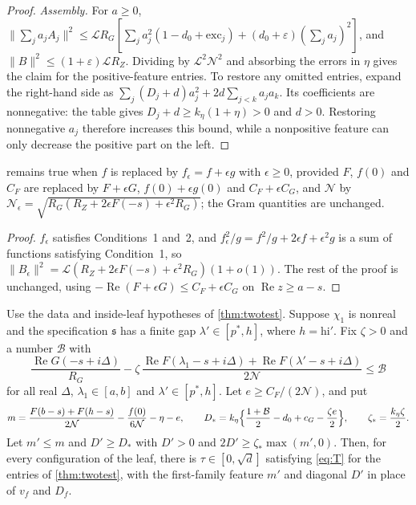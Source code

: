 \documentclass[11pt]{amsart}
\numberwithin{equation}{section}
\theoremstyle{plain}
\theoremstyle{definition}
\theoremstyle{remark}
\newcommand{\LL}{\mathcal{L}}
\renewcommand{\Re}{\operatorname{Re}}
\newcommand{\eps}{\varepsilon}
\newcommand{\hi}{\mathrm{hi}}
\newcommand{\1}{\mathbf{1}}
\begin{document}
\begin{proof}
\emph{Assembly.} For $a\ge0$,
$\|\sum_ja_jA_j\|^2\le\LL R_G[\sum_ja_j^2(1-d_0+\mathrm{exc}_j)+(d_0+\eps)(\sum_ja_j)^2]$, and
$\|B\|^2\le(1+\eps)\LL R_Z$. Dividing by $\LL^2\mathcal N^2$ and absorbing the errors in $\eta$ gives the claim
for the positive-feature entries. To restore any omitted entries, expand the
right-hand side as
$\sum_j(D_j+d)a_j^2+2d\sum_{j<k}a_ja_k$. Its coefficients are nonnegative:
the table gives $D_j+d\ge k_\eta(1+\eta)>0$ and $d>0$.
Restoring nonnegative $a_j$ therefore increases this bound, while a nonpositive feature
can only decrease the positive part on the left.
\end{proof}

\begin{proposition}\label{prop:mixture}
 remains true when $f$ is replaced by $f_\epsilon=f+\epsilon g$ with $\epsilon\ge0$, provided
$F$, $f(0)$ and $C_F$ are replaced by $F+\epsilon G$, $f(0)+\epsilon g(0)$ and $C_F+\epsilon C_G$, and $\mathcal N$ by
$\mathcal N_\epsilon=\sqrt{R_G(R_Z+2\epsilon F(-s)+\epsilon^2R_G)}$; the Gram quantities are unchanged.
\end{proposition}

\begin{proof}
$f_\epsilon$ satisfies Conditions~1 and~2, and $f_\epsilon^2/g=f^2/g+2\epsilon f+\epsilon^2g$ is a sum of functions
satisfying Condition~1, so $\|B_\epsilon\|^2=\LL(R_Z+2\epsilon F(-s)+\epsilon^2R_G)(1+o(1))$. The rest of the proof
is unchanged, using $-\Re(F+\epsilon G)\le C_F+\epsilon C_G$ on $\Re z\ge a-s$.
\end{proof}

\begin{proposition}\label{prop:paired}
Use the data and inside-leaf hypotheses of \cref{thm:twotest}. Suppose $\chi_1$ is
nonreal and the specification $\mathfrak s$ has a finite gap
$\lambda'\in[p^*,h]$, where $h=\hi'$. Fix $\zeta>0$ and
a number $\mathcal B$ with
\begin{equation}\label{eq:pairB}
  \frac{\Re G(-s+i\Delta)}{R_G}-\zeta\,\frac{\Re F(\lambda_1-s+i\Delta)+\Re F(\lambda'-s+i\Delta)}{2\mathcal N}\le\mathcal B
\end{equation}
for all real $\Delta$, $\lambda_1\in[a,b]$ and $\lambda'\in[p^*,h]$. Let $e\ge C_F/(2\mathcal N)$, and put
\[
  m=\frac{F(b-s)+F(h-s)}{2\mathcal N}-\frac{f(0)}{6\mathcal N}-\eta-e,\qquad
  D_*=k_\eta\Bigl\{\frac{1+\mathcal B}2-d_0+c_G-\frac{\zeta e}2\Bigr\},\qquad\zeta_*=\frac{k_\eta\zeta}2 .
\]
Let $m'\le m$ and $D'\ge D_*$ with $D'>0$ and $2D'\ge\zeta_*\max(m',0)$. Then, for every configuration
of the leaf, there is $\tau\in[0,\sqrt d]$ satisfying \eqref{eq:T} for the entries of \cref{thm:twotest},
with the first-family feature $m'$ and diagonal $D'$ in place of $v_f$ and $D_f$.
\end{proposition}
\end{document}
